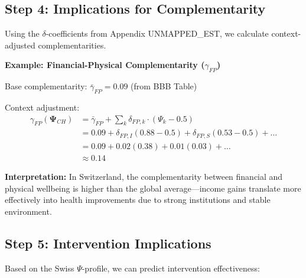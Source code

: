 \subsection{Step 4: Implications for Complementarity}

Using the $\delta$-coefficients from Appendix UNMAPPED_EST, we calculate context-adjusted 
complementarities.

\textbf{Example: Financial-Physical Complementarity ($\gamma_{FP}$)}

Base complementarity: $\bar{\gamma}_{FP} = 0.09$ (from BBB Table)

Context adjustment:
\begin{align*}
\gamma_{FP}(\boldsymbol{\Psi}_{CH}) &= \bar{\gamma}_{FP} + \sum_k \delta_{FP,k} \cdot (\Psi_k - 0.5) \\
&= 0.09 + \delta_{FP,I}(0.88-0.5) + \delta_{FP,S}(0.53-0.5) + \ldots \\
&= 0.09 + 0.02(0.38) + 0.01(0.03) + \ldots \\
&\approx 0.14
\end{align*}

\textbf{Interpretation:} In Switzerland, the complementarity between financial 
and physical wellbeing is higher than the global average---income gains 
translate more effectively into health improvements due to strong institutions 
and stable environment.

\subsection{Step 5: Intervention Implications}

Based on the Swiss $\Psi$-profile, we can predict intervention effectiveness:

